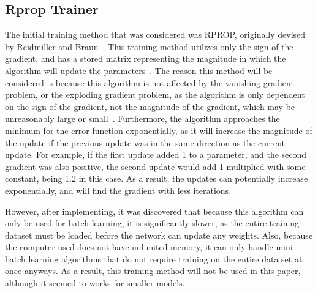 \documentclass[12pt, titlepage]{article}
\begin{document}

\subsection{Rprop Trainer}
The initial training method that was considered was RPROP, originally devised by
Reidmiller and Braun~\cite{rprop}. This training method utilizes only the sign
of the gradient, and has a stored matrix representing the magnitude in which the
algorithm will update the parameters~\cite{rprop}. The reason this method will
be considered is because this algorithm is not affected by the vanishing
gradient problem, or the exploding gradient problem, as the algorithm is only
dependent on the sign of the gradient, not the magnitude of the gradient, which
may be unreasonably large or small~\cite{rprop}.
Furthermore, the algorithm approaches the minimum for the error function
exponentially, as it will increase the magnitude of the update if the previous
update was in the same direction as the current update. For example, if the
first update added 1 to a parameter, and the second gradient was also positive,
the second update would add 1 multiplied with some constant, being 1.2 in this
case. As a result, the updates can potentially increase exponentially, and will
find the gradient with less iterations.

However, after implementing, it was discovered that because this algorithm can
only be used for batch learning, it is significantly slower, as the entire
training dataset must be loaded before the network can update any weights. Also,
because the computer used does not have unlimited memory, it can only handle
mini batch learning algorithms that do not require training on the entire data
set at once anyways.  As a result, this training method will not be used in this
paper, although it seemed to works for smaller models.
\end{document}
